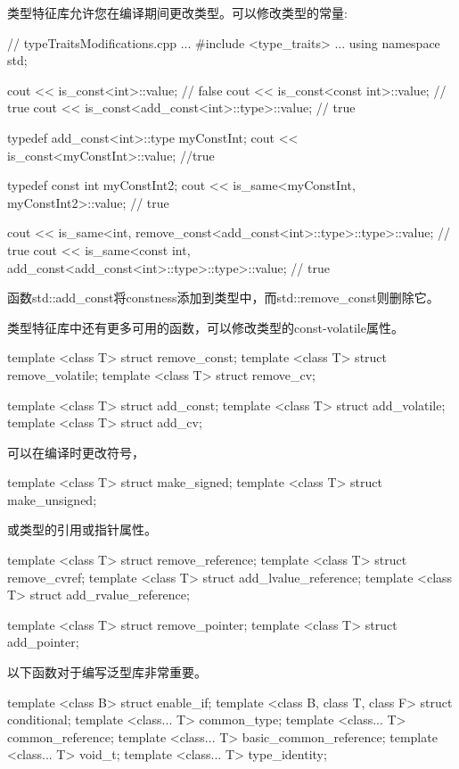 
类型特征库允许您在编译期间更改类型。可以修改类型的常量:


\begin{cpp}
// typeTraitsModifications.cpp
...
#include <type_traits>
...
using namespace std;

cout << is_const<int>::value; // false
cout << is_const<const int>::value; // true
cout << is_const<add_const<int>::type>::value; // true

typedef add_const<int>::type myConstInt;
cout << is_const<myConstInt>::value; //true

typedef const int myConstInt2;
cout << is_same<myConstInt, myConstInt2>::value; // true

cout << is_same<int, remove_const<add_const<int>::type>::type>::value; // true
cout << is_same<const int, add_const<add_const<int>::type>::type>::value; // true
\end{cpp}

函数std::add\_const将constness添加到类型中，而std::remove\_const则删除它。

类型特征库中还有更多可用的函数，可以修改类型的const-volatile属性。

\begin{cpp}
template <class T> struct remove_const;
template <class T> struct remove_volatile;
template <class T> struct remove_cv;

template <class T> struct add_const;
template <class T> struct add_volatile;
template <class T> struct add_cv;
\end{cpp}

可以在编译时更改符号，

\begin{cpp}
template <class T> struct make_signed;
template <class T> struct make_unsigned;
\end{cpp}

或类型的引用或指针属性。

\begin{cpp}
template <class T> struct remove_reference;
template <class T> struct remove_cvref;
template <class T> struct add_lvalue_reference;
template <class T> struct add_rvalue_reference;

template <class T> struct remove_pointer;
template <class T> struct add_pointer;
\end{cpp}

以下函数对于编写泛型库非常重要。

\begin{cpp}
template <class B> struct enable_if;
template <class B, class T, class F> struct conditional;
template <class... T> common_type;
template <class... T> common_reference;
template <class... T> basic_common_reference;
template <class... T> void_t;
template <class... T> type_identity;
\end{cpp}

